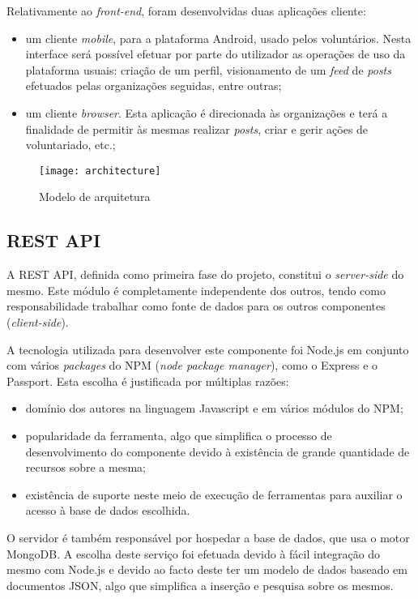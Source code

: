 Relativamente ao \textit{front-end}, foram desenvolvidas duas aplicações cliente: 
\begin{itemize}
	\item um cliente \textit{mobile}, para a plataforma Android, usado pelos voluntários. Nesta interface será possível efetuar por parte do utilizador as operações de uso da plataforma usuais: criação de um perfil, visionamento de um \textit{feed} de \textit{posts} efetuados pelas organizações seguidas, entre outras;
	\item um cliente \textit{browser}. Esta aplicação é direcionada às organizações e terá a finalidade de permitir às mesmas realizar \textit{posts}, criar e gerir ações de voluntariado, etc.;
\end{itemize}

\begin{figure}[h]
	\centering
	\texttt{[image: architecture]}
	\caption{Modelo de arquitetura}
\end{figure}


\subsection{REST API}
A REST API, definida como primeira fase do projeto, constitui o \textit{server-side} do mesmo. Este módulo é completamente independente dos outros, tendo como responsabilidade trabalhar como fonte de dados para os outros componentes (\textit{client-side}). \par \medskip 

A tecnologia utilizada para desenvolver este componente foi Node.js em conjunto com vários \textit{packages} do NPM (\textit{node package manager}), como o Express e o Passport. Esta escolha é justificada por múltiplas razões:
\begin{itemize}
	\item domínio dos autores na linguagem Javascript e em vários módulos do NPM;
	\item popularidade da ferramenta, algo que simplifica o processo de desenvolvimento do componente devido à existência de grande quantidade de recursos sobre a mesma;
	\item existência de suporte neste meio de execução de ferramentas para auxiliar o acesso à base de dados escolhida.
\end{itemize}
\par \medskip

O servidor é também responsável por hospedar a base de dados, que usa o motor MongoDB. A escolha deste serviço foi efetuada devido à fácil integração do mesmo com Node.js e devido ao facto deste ter um modelo de dados baseado em documentos JSON, algo que simplifica a inserção e pesquisa sobre os mesmos.
\par \medskip

